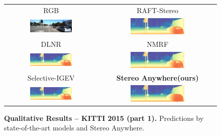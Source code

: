 \documentclass[10pt,twocolumn,letterpaper]{article}
\newcommand{\method}[0]{Stereo Anywhere\xspace}
\begin{document}
\begin{figure}[h]
\begin{tabular}{cc}
        \small RGB &
        \small RAFT-Stereo \cite{lipson2021raft} \\
        \includegraphics[width=0.48\textwidth]{imgs/KITTI/rgb/49.jpg} &
        \includegraphics[width=0.48\textwidth]{imgs/KITTI/stereo/RAFT-Stereo/49.jpg} \\
        \small DLNR \cite{zhao2023high} &
        \small NMRF \cite{guan2024neural} \\
        \includegraphics[width=0.48\textwidth]{imgs/KITTI/stereo/DLNR/49.jpg} &
        \includegraphics[width=0.48\textwidth]{imgs/KITTI/stereo/NMRF/49.jpg} \\
        \small Selective-IGEV \cite{wang2024selective} &
        \textbf{\method (ours)} \\
        \includegraphics[width=0.48\textwidth]{imgs/KITTI/stereo/Selective/49.jpg} &
        \includegraphics[width=0.48\textwidth]{imgs/KITTI/stereo/Ours/49.jpg} \\
    \end{tabular}\vspace{-0.3cm}
    \caption{\textbf{Qualitative Results -- KITTI 2015 (part 1).} Predictions by state-of-the-art models and \method.}
    \label{fig:qual_kitti15_1}\vspace{-0.3cm}
\end{figure}
\end{document}
